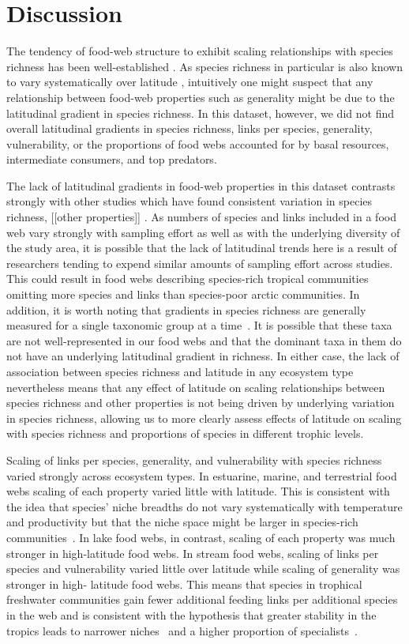 \documentclass[12pt]{article}
\begin{document}
\section*{Discussion}

The tendency of food-web structure to exhibit scaling relationships with
species richness has been well-established \citep{Dunne2004,Riede2010}. As
species richness in particular is also known to vary systematically over
latitude \citep{}, intuitively one might suspect that any relationship
between food-web properties such as generality might be due to the latitudinal
gradient in species richness. In this dataset, however, we did not find
overall latitudinal gradients in species richness, links per species, 
generality, vulnerability, or the proportions of food webs accounted for by 
basal resources, intermediate consumers, and top predators. 


The lack of latitudinal gradients in food-web properties in this dataset contrasts
strongly with other studies which have found consistent variation in species richness,
[[other properties]] \citep{}. As numbers of species and links included in a food web
vary strongly with sampling effort as well as with the underlying diversity of the study
area, it is possible that the lack of latitudinal trends here is a result of researchers
tending to expend similar amounts of sampling effort across studies. This could result in
food webs describing species-rich tropical communities omitting more species and links
than species-poor arctic communities. In addition, it is worth noting that gradients in
species richness are generally measured for a single taxonomic group at a time~\citep{}.
It is possible that these taxa are not well-represented in our food webs and that the
dominant taxa in them do not have an underlying latitudinal gradient in richness. In
either case, the lack of association between species richness
and latitude in any ecosystem type nevertheless means that any effect of latitude on scaling relationships
between species richness and other properties is not being driven by underlying variation in
species richness, allowing us to more clearly assess effects of latitude on scaling with 
species richness and proportions of species in different trophic levels.


Scaling of links per species, generality, and vulnerability with species
richness varied strongly across ecosystem types. In estuarine, marine, and
terrestrial food webs scaling of each property varied little with latitude.
This is consistent with the idea that species' niche breadths do not vary
systematically with temperature and productivity but that the niche space
might be larger in species-rich communities~\citep{Davies2007}. In lake food
webs, in contrast, scaling of each property was much stronger in high-latitude
food webs. In stream food webs, scaling of links per species and vulnerability
varied little over latitude while scaling of generality was stronger in high-
latitude food webs. This means that species in trophical freshwater
communities gain fewer additional feeding links per additional species in the
web and is consistent with the hypothesis that greater stability in the
tropics leads to narrower niches~\citep{Brown2004} and a higher proportion of
specialists~\citep{}.
\end{document}
